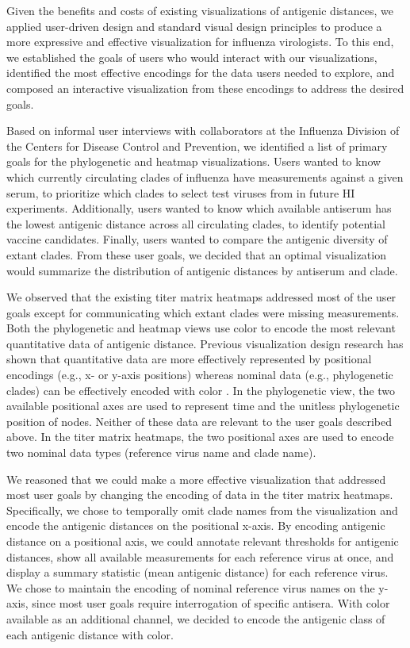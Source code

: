 \documentclass[utf8]{FrontiersinHarvard} %
\begin{document}
Given the benefits and costs of existing visualizations of antigenic distances, we applied user-driven design and standard visual design principles to produce a more expressive and effective visualization for influenza virologists.
To this end, we established the goals of users who would interact with our visualizations, identified the most effective encodings for the data users needed to explore, and composed an interactive visualization from these encodings to address the desired goals.

Based on informal user interviews with collaborators at the Influenza Division of the Centers for Disease Control and Prevention, we identified a list of primary goals for the phylogenetic and heatmap visualizations.
Users wanted to know which currently circulating clades of influenza have measurements against a given serum, to prioritize which clades to select test viruses from in future HI experiments.
Additionally, users wanted to know which available antiserum has the lowest antigenic distance across all circulating clades, to identify potential vaccine candidates.
Finally, users wanted to compare the antigenic diversity of extant clades.
From these user goals, we decided that an optimal visualization would summarize the distribution of antigenic distances by antiserum and clade.

We observed that the existing titer matrix heatmaps addressed most of the user goals except for communicating which extant clades were missing measurements.
Both the phylogenetic and heatmap views use color to encode the most relevant quantitative data of antigenic distance.
Previous visualization design research has shown that quantitative data are more effectively represented by positional encodings (e.g., x- or y-axis positions) whereas nominal data (e.g., phylogenetic clades) can be effectively encoded with color \citep{Mackinlay1986}.
In the phylogenetic view, the two available positional axes are used to represent time and the unitless phylogenetic position of nodes.
Neither of these data are relevant to the user goals described above.
In the titer matrix heatmaps, the two positional axes are used to encode two nominal data types (reference virus name and clade name).

We reasoned that we could make a more effective visualization that addressed most user goals by changing the encoding of data in the titer matrix heatmaps.
Specifically, we chose to temporally omit clade names from the visualization and encode the antigenic distances on the positional x-axis.
By encoding antigenic distance on a positional axis, we could annotate relevant thresholds for antigenic distances, show all available measurements for each reference virus at once, and display a summary statistic (mean antigenic distance) for each reference virus.
We chose to maintain the encoding of nominal reference virus names on the y-axis, since most user goals require interrogation of specific antisera.
With color available as an additional channel, we decided to encode the antigenic class of each antigenic distance with color.
\end{document}
